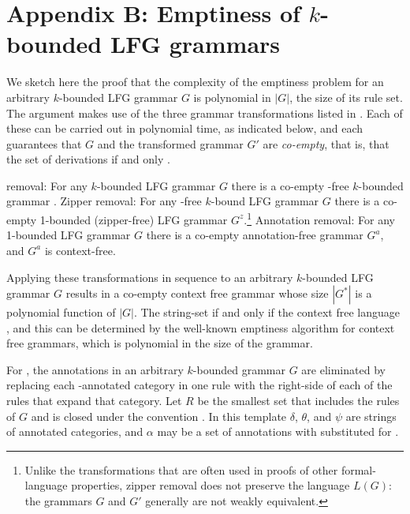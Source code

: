\documentclass[output=paper,hidelinks]{langscibook}
\begin{document}
\section* {Appendix B:  Emptiness of $k$-bounded LFG grammars}

We sketch here the proof that the complexity of the emptiness problem for an arbitrary $k$-bounded LFG grammar $G$ is polynomial in $|G|$, the size of its rule set.  The argument makes use of the three grammar transformations listed in .  Each of these can be carried out in polynomial time, as indicated below, and each guarantees that $G$ and the transformed grammar $G'$ are \textit{co-empty}, that is, that the set of derivations  if and only .   

\ea\label{transformations}
\ea\label{trivialremoval} \trivial removal:  For any $k$-bounded LFG grammar $G$ there is a co-empty \trivial-free $k$-bounded grammar \Gminus.
\ex\label{zipperremoval}
    Zipper removal:  For any \trivial-free $k$-bound LFG grammar $G$ there is a co-empty 1-bounded (zipper-free) LFG grammar $G^z$.\footnote{Unlike the transformations that are often used in proofs of other formal-language properties, zipper removal does not preserve the language $L(G)$: the grammars $G$ and $G'$ generally are not weakly equivalent.} 
\ex\label{annotationremoval}
   Annotation removal:  For any 1-bounded LFG grammar $G$ there is a co-empty annotation-free grammar $G^a$, and $G^a$ is context-free.
\z\z

\noindent Applying these transformations in sequence to an arbitrary $k$-bounded LFG grammar $G$ results in a co-empty context free grammar  whose size $|G^*|$ is a polynomial function of $|G|$. The string-set  if and only if the context free language , and this can be determined by the well-known emptiness algorithm for context free grammars, which is polynomial in the size of the grammar. 

\def\Vbar{\mbox{$\overline{\textrm{V}}$}\xspace}
\def\VPbar{\mbox{$\overline{\textrm{VP}}$}\xspace}

For , the \trivial annotations in an arbitrary $k$-bounded grammar $G$ are eliminated by replacing each \trivial-annotated category in one rule with the right-side of each of the rules that expand that category. Let $R$ be the smallest set that includes the rules of $G$ and is closed under the convention . In this template $\delta$, $\theta$, and $\psi$ are strings of annotated categories, and $\alpha$ may be a set of annotations with \up substituted for \down.
\end{document}
